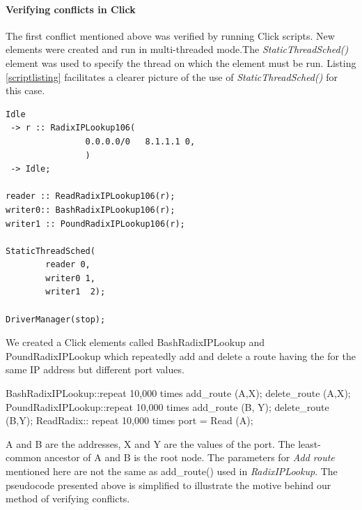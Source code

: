 \documentclass[a4paper,marginparwidth=50pt,marginparsep=10pt]{article}
\begin{document}
\paragraph{Verifying conflicts in Click}
The first conflict mentioned above was verified by running Click scripts. New elements were created and run in multi-threaded mode.The \emph{StaticThreadSched()} element was used to specify the thread on which the element must be run. Listing \ref{scriptlisting} facilitates a clearer picture of the use of \emph{StaticThreadSched()} for this case.
\begin{lstlisting}[caption = Click script for verifying reader-updater conflicts, label=scriptlisting]
Idle
 -> r :: RadixIPLookup106(
                0.0.0.0/0   8.1.1.1 0,
                ) 
 -> Idle;

reader :: ReadRadixIPLookup106(r);
writer0:: BashRadixIPLookup106(r);
writer1 :: PoundRadixIPLookup106(r);

StaticThreadSched(
        reader 0,
        writer0 1,
        writer1  2);

DriverManager(stop);
\end{lstlisting}
We created a Click elements called BashRadixIPLookup and PoundRadixIPLookup which repeatedly add and delete a route having the for the same IP address but different port values.
\begin{code}
  BashRadixIPLookup::repeat 10,000 times {
    add_route (A,X);
    delete_route (A,X);
  }
  PoundRadixIPLookup::repeat 10,000 times {
    add_route (B, Y);
    delete_route (B,Y);
  } 
  ReadRadix:: repeat 10,000 times {
    port = Read (A);
  }
\end{code}
A and B are the addresses, X and Y are the values of the port. The least-common ancestor of A and B is the root node. The parameters for \emph{Add route} mentioned here are not the same as add\_route() used in \emph{RadixIPLookup}. The pseudocode presented above is simplified to illustrate the motive behind our method of verifying conflicts.
\end{document}
